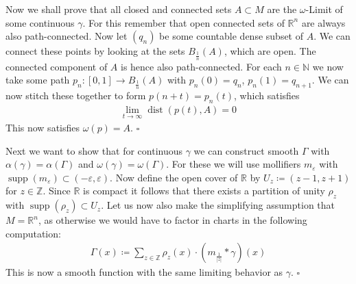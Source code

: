 \documentclass{article}
\DeclareMathOperator{\supp}{supp}
\DeclareMathOperator{\dist}{dist}
\newcommand*{\qed}{\hfill\ensuremath{\square}}
\begin{document}
	Now we shall prove that all closed and connected sets $A \subset M$
	are the $\omega$-Limit of some continuous $\gamma$. For this remember
	that open connected sets of $\mathbb R^n$ are always also path-connected.
	Now let $(q_n)$ be some countable dense subset of $A$. We can connect these
	points by looking at the sets $B_{\frac 1 n}(A)$, which are open. The 
	connected component of $A$ is hence also path-connected. For each 
	$n \in \mathbb N$ we now take some path $p_n: [0,1] \to B_{\frac 1 n}(A)$ with
	$p_n(0) = q_n$, $p_n(1) = q_{n+1}$. We can now stitch these together to
	form $p(n + t) = p_n(t)$, which satisfies
	\begin{align*}
		\lim_{t \to\infty} \dist(p(t), A) = 0
	\end{align*}
	This now satisfies $\omega(p) = A$. \qed
	
	Next we want to show that for continuous $\gamma$ we can construct
	smooth $\Gamma$ with $\alpha(\gamma) = \alpha(\Gamma)$ and
	$\omega(\gamma) = \omega(\Gamma)$. For these we will use mollifiers
	$m_\varepsilon$ with $\supp(m_\varepsilon) \subset (-\varepsilon,\varepsilon)$.
	Now define the open cover of $\mathbb R$ by $U_z \coloneq (z-1,z+1)$ for $z \in \mathbb Z$.
	Since $\mathbb R$ is compact it follows that there exists a partition of unity
	$\rho_z$ with $\supp(\rho_z) \subset U_z$. Let us now also make the simplifying
	assumption that $M = \mathbb R^n$, as otherwise we would have to factor in 
	charts in the following computation:
	\begin{align*}
		\Gamma(x) \coloneq \sum_{z \in \mathbb Z} \rho_z(x) \cdot (m_{\frac 1 {|z|}} \ast \gamma)(x)
	\end{align*}
	This is now a smooth function with the same limiting behavior as $\gamma$.
	\qed
	
\end{document}
